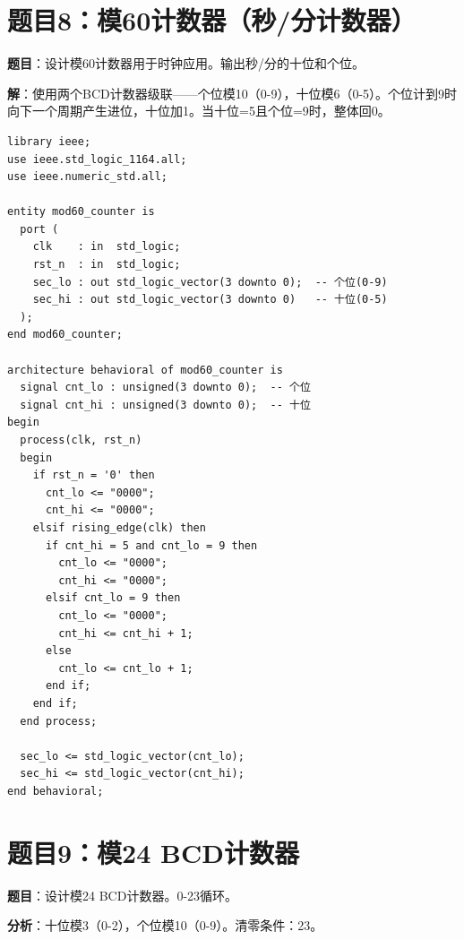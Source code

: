 \section*{题目8：模60计数器（秒/分计数器）}

\textbf{题目}：设计模60计数器用于时钟应用。输出秒/分的十位和个位。

\textbf{解}：使用两个BCD计数器级联——个位模10（0-9），十位模6（0-5）。个位计到9时向下一个周期产生进位，十位加1。当十位=5且个位=9时，整体回0。

\begin{lstlisting}[caption={模60 BCD计数器}]
library ieee;
use ieee.std_logic_1164.all;
use ieee.numeric_std.all;

entity mod60_counter is
  port (
    clk    : in  std_logic;
    rst_n  : in  std_logic;
    sec_lo : out std_logic_vector(3 downto 0);  -- 个位(0-9)
    sec_hi : out std_logic_vector(3 downto 0)   -- 十位(0-5)
  );
end mod60_counter;

architecture behavioral of mod60_counter is
  signal cnt_lo : unsigned(3 downto 0);  -- 个位
  signal cnt_hi : unsigned(3 downto 0);  -- 十位
begin
  process(clk, rst_n)
  begin
    if rst_n = '0' then
      cnt_lo <= "0000";
      cnt_hi <= "0000";
    elsif rising_edge(clk) then
      if cnt_hi = 5 and cnt_lo = 9 then
        cnt_lo <= "0000";
        cnt_hi <= "0000";
      elsif cnt_lo = 9 then
        cnt_lo <= "0000";
        cnt_hi <= cnt_hi + 1;
      else
        cnt_lo <= cnt_lo + 1;
      end if;
    end if;
  end process;

  sec_lo <= std_logic_vector(cnt_lo);
  sec_hi <= std_logic_vector(cnt_hi);
end behavioral;
\end{lstlisting}

\section*{题目9：模24 BCD计数器}

\textbf{题目}：设计模24 BCD计数器。0-23循环。

\textbf{分析}：十位模3（0-2），个位模10（0-9）。清零条件：23。

